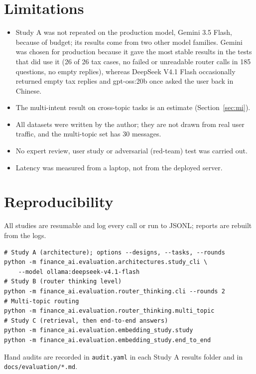 \documentclass[11pt,a4paper]{article}
\begin{document}
\section{Limitations}
\begin{itemize}
\item Study A was not repeated on the production model, Gemini 3.5 Flash, because of budget; its results come from two other model families. Gemini was chosen for production because it gave the most stable results in the tests that did use it (26 of 26 tax cases, no failed or unreadable router calls in 185 questions, no empty replies), whereas DeepSeek V4.1 Flash occasionally returned empty tax replies and gpt-oss:20b once asked the user back in Chinese.
\item The multi-intent result on cross-topic tasks is an estimate (Section~\ref{sec:mi}).
\item All datasets were written by the author; they are not drawn from real user traffic, and the multi-topic set has 30 messages.
\item No expert review, user study or adversarial (red-team) test was carried out.
\item Latency was measured from a laptop, not from the deployed server.
\end{itemize}

\section{Reproducibility}
All studies are resumable and log every call or run to JSONL; reports are rebuilt from the logs.
{\small
\begin{verbatim}
# Study A (architecture); options --designs, --tasks, --rounds
python -m finance_ai.evaluation.architectures.study_cli \
    --model ollama:deepseek-v4.1-flash
# Study B (router thinking level)
python -m finance_ai.evaluation.router_thinking.cli --rounds 2
# Multi-topic routing
python -m finance_ai.evaluation.router_thinking.multi_topic
# Study C (retrieval, then end-to-end answers)
python -m finance_ai.evaluation.embedding_study.study
python -m finance_ai.evaluation.embedding_study.end_to_end
\end{verbatim}}
Hand audits are recorded in \texttt{audit.yaml} in each Study A results folder and in \texttt{docs/evaluation/*.md}.

\appendix
\end{document}
